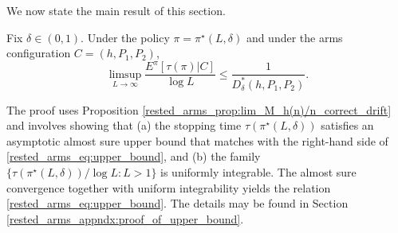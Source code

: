We now state the main result of this section.
\begin{prop}\label{rested_arms_prop:upper_bound}
	Fix $\delta\in(0,1)$. Under the policy $\pi=\pi^\star(L,\delta)$ and under the arms configuration $C=(h, P_1, P_2)$,
	\begin{equation}
		\limsup\limits_{L\to\infty}\frac{E^\pi[\tau(\pi)|C]}{\log L}\leq \frac{1}{D_\delta^*(h,P_1,P_2)}.\label{rested_arms_eq:upper_bound}
	\end{equation}
\end{prop}
{The proof uses Proposition \ref{rested_arms_prop:lim_M_h(n)/n_correct_drift} and involves showing that (a) the stopping time $\tau(\pi^\star(L, \delta))$ satisfies an asymptotic almost sure upper bound that matches with the right-hand side of \eqref{rested_arms_eq:upper_bound}, and (b) the family $\{\tau(\pi^\star(L,\delta))/\log L:L> 1\}$ is uniformly integrable. The almost sure convergence together with uniform integrability yields the relation \eqref{rested_arms_eq:upper_bound}. The details may be found in Section \ref{rested_arms_appndx:proof_of_upper_bound}.}

